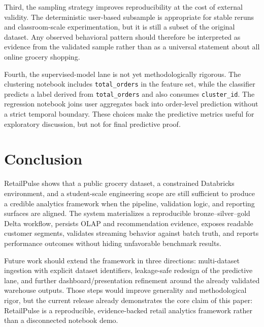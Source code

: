 \documentclass[journal]{IEEEtran}
\begin{document}
Third, the sampling strategy improves reproducibility at the cost of external validity. The deterministic user-based subsample is appropriate for stable reruns and classroom-scale experimentation, but it is still a subset of the original dataset. Any observed behavioral pattern should therefore be interpreted as evidence from the validated sample rather than as a universal statement about all online grocery shopping.

Fourth, the supervised-model lane is not yet methodologically rigorous. The clustering notebook includes \texttt{total\_orders} in the feature set, while the classifier predicts a label derived from \texttt{total\_orders} and also consumes \texttt{cluster\_id}. The regression notebook joins user aggregates back into order-level prediction without a strict temporal boundary. These choices make the predictive metrics useful for exploratory discussion, but not for final predictive proof.

\section{Conclusion}
RetailPulse shows that a public grocery dataset, a constrained Databricks environment, and a student-scale engineering scope are still sufficient to produce a credible analytics framework when the pipeline, validation logic, and reporting surfaces are aligned. The system materializes a reproducible bronze--silver--gold Delta workflow, persists OLAP and recommendation evidence, exposes readable customer segments, validates streaming behavior against batch truth, and reports performance outcomes without hiding unfavorable benchmark results.

Future work should extend the framework in three directions: multi-dataset ingestion with explicit dataset identifiers, leakage-safe redesign of the predictive lane, and further dashboard/presentation refinement around the already validated warehouse outputs. Those steps would improve generality and methodological rigor, but the current release already demonstrates the core claim of this paper: RetailPulse is a reproducible, evidence-backed retail analytics framework rather than a disconnected notebook demo.



\end{document}

